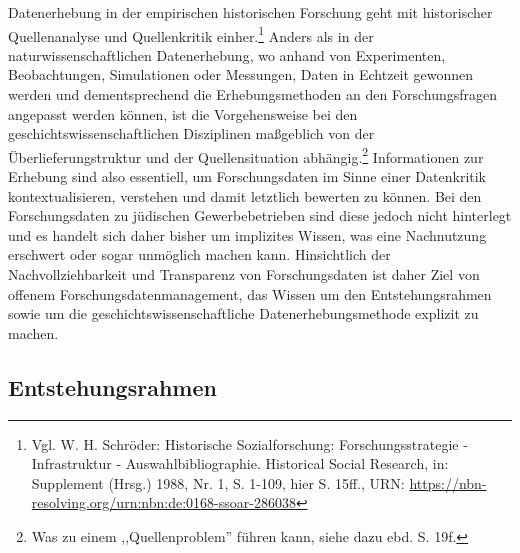 Datenerhebung in der empirischen historischen Forschung geht mit historischer Quellenanalyse und Quellenkritik einher.\footnote{Vgl. W. H. Schröder: Historische Sozialforschung: Forschungsstrategie - Infrastruktur - Auswahlbibliographie.
Historical Social Research, in: Supplement (Hrsg.) 1988, Nr. 1, S. 1-109, hier S. 15ff., URN: \url{https://nbn-resolving.org/urn:nbn:de:0168-ssoar-286038}
} Anders als in der naturwissenschaftlichen Datenerhebung, wo anhand von Experimenten, Beobachtungen, Simulationen oder Messungen, Daten in Echtzeit gewonnen werden und dementsprechend die Erhebungsmethoden an den Forschungsfragen angepasst werden können, ist die Vorgehensweise bei den geschichtswissenschaftlichen Disziplinen maßgeblich von der Überlieferungstruktur und der Quellensituation abhängig.\footnote{Was zu einem ,,Quellenproblem'' führen kann, siehe dazu ebd. S. 19f.} Informationen zur Erhebung sind also essentiell, um Forschungsdaten im Sinne einer Datenkritik kontextualisieren, verstehen und damit letztlich bewerten zu können. Bei den Forschungsdaten zu jüdischen Gewerbebetrieben sind diese jedoch nicht hinterlegt und es handelt sich daher bisher um implizites Wissen, was eine Nachnutzung erschwert oder sogar unmöglich machen kann. Hinsichtlich der Nachvollziehbarkeit und Transparenz von Forschungsdaten ist daher Ziel von offenem Forschungsdatenmanagement, das Wissen um den Entstehungsrahmen sowie um die geschichtswissenschaftliche Datenerhebungsmethode explizit zu machen. 

\subsection{Entstehungsrahmen}

